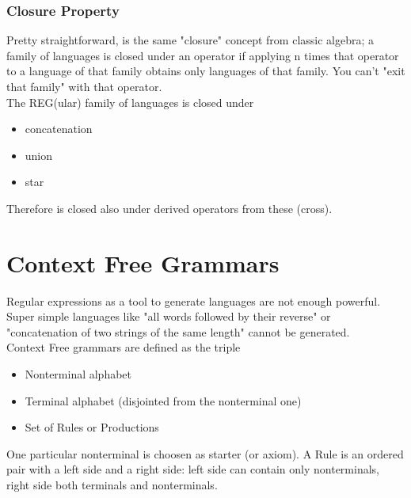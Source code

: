 \documentclass[10pt,a4paper]{article}
\begin{document}
		\section{Closure Property}
			Pretty straightforward, is the same "closure" concept from classic algebra; a family of languages is closed under an operator if applying n times that operator to a language of that family obtains only languages of that family. You can't "exit that family" with that operator.\\
			The REG(ular) family of languages is closed under
			\begin{itemize}
				\item concatenation
				\item union
				\item star
			\end{itemize}
			Therefore is closed also under derived operators from these (cross).
	
	\clearpage			
	\part{Context Free Grammars}
		Regular expressions as a tool to generate languages are not enough powerful. Super simple languages like "all words followed by their reverse" or "concatenation of two strings of the same length" cannot be generated.\\
		Context Free grammars are defined as the triple
		\begin{itemize}
			\item Nonterminal alphabet
			\item Terminal alphabet (disjointed from the nonterminal one)
			\item Set of Rules or Productions
		\end{itemize}
		One particular nonterminal is choosen as starter (or axiom). A Rule is an ordered pair with a left side and a right side: left side can contain only nonterminals, right side both terminals and nonterminals. 
		
\end{document}

